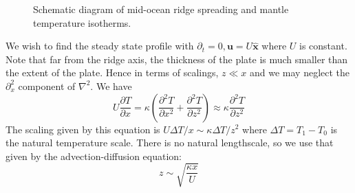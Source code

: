 \documentclass{jknotes}
\begin{document}
\begin{figure}
	\begin{center}
	\caption{Schematic diagram of mid-ocean ridge spreading and mantle
	temperature isotherms.}
\end{center}
\end{figure}


We wish to find the steady state profile with $\partial_t = 0, \symbf{u} = U
\hat{\symbf{x}}$ where $U$ is constant. Note that far from the ridge axis, the
thickness of the plate is much smaller than the extent of the plate. Hence in
terms of scalings, $z \ll x$ and we may neglect the $\partial_x^2$ component
of $\nabla^2$. We have
\begin{equation}
	U \frac{\partial T}{\partial x} = \kappa \left( \frac{\partial^2
	T}{\partial x^2} + \frac{\partial^2 T}{\partial z^2}\right) \approx \kappa
	\frac{\partial^2 T}{\partial z^2}
	\label{eq:temp}
\end{equation}
The scaling given by this equation is $U\Delta T / x \sim \kappa \Delta T /
z^2$ where $\Delta T = T_1 - T_0$ is the natural temperature scale. There is
no natural lengthscale, so we use that given by the advection-diffusion
equation:
\begin{equation}
	z \sim \sqrt{\frac{\kappa x}{U}}
\end{equation}
\end{document}
